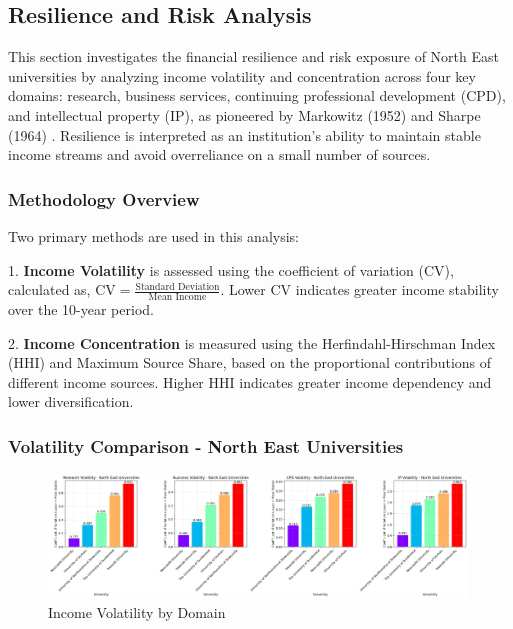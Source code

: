 \documentclass[journal,onecolumn, 10pt,draftclsnofoot]{IEEEtran}
\begin{document}
\subsection{Resilience and Risk Analysis}
\label{sec:resilience-risk}

This section investigates the financial resilience and risk exposure of North East universities by analyzing income volatility and concentration across four key domains: research, business services, continuing professional development (CPD), and intellectual property (IP), as pioneered by Markowitz (1952) \cite{markowitz1952portfolio} and Sharpe (1964) \cite{sharpe1964capital}. Resilience is interpreted as an institution's ability to maintain stable income streams and avoid overreliance on a small number of sources.

\subsubsection{Methodology Overview}

Two primary methods are used in this analysis:

1. \textbf{Income Volatility} is assessed using the coefficient of variation (CV), calculated as, $\mathrm{CV}=\frac{\text{Standard Deviation}}{\text{Mean Income}}$. Lower CV indicates greater income stability over the 10-year period.

2. \textbf{Income Concentration} is measured using the Herfindahl-Hirschman Index (HHI) and Maximum Source Share, based on the proportional contributions of different income sources. Higher HHI indicates greater income dependency and lower diversification.

\subsubsection{Volatility Comparison - North East Universities}

\begin{figure}[h]
\centering
\includegraphics[width=0.99\textwidth]{Fig/figure41.ne_volatility_comparison.png}
\caption{Income Volatility by Domain}
\label{fig:ne-volatility-comparison}
\end{figure}
\end{document}

